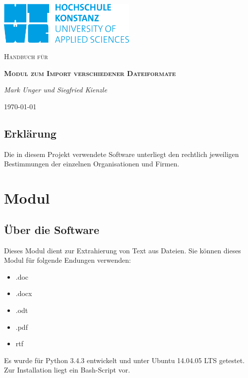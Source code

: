 \documentclass[12pt]{scrartcl}
\begin{document}
\begin{titlepage}
	\centering
	\includegraphics[width=0.5\textwidth]{HTWG}\par\vspace{2.5cm}
	\vspace{1cm}
	{\scshape\Large Handbuch für\par}
	\vspace{1.5cm} 
	{\scshape\bfseries Modul zum Import verschiedener Dateiformate\par}
	\vspace{2cm}
	{\Large\itshape Mark Unger und Siegfried Kienzle\par}
	\vfill

	{\large \today\par}
\end{titlepage}


\newpage

\begin{center}
\section*{Erklärung}
Die in diesem Projekt verwendete Software unterliegt den 
rechtlich jeweiligen Bestimmungen der einzelnen Organisationen und Firmen. 
\vfill
\end{center}

\newpage
\tableofcontents
\newpage

\section{Modul}
\label{sec:modul-einleitung}

\subsection{Über die Software}
\label{sec:software-einleitung}
Dieses Modul dient zur Extrahierung von Text aus Dateien. 
Sie können dieses Modul für folgende Endungen verwenden:
\begin{itemize}
	\item .doc
	\item .docx
	\item .odt
	\item .pdf
	\item rtf
\end{itemize}
Es wurde für Python 3.4.3 entwickelt und unter 
Ubuntu 14.04.05 LTS getestet. Zur Installation liegt 
ein Bash-Script vor. 
\end{document}
